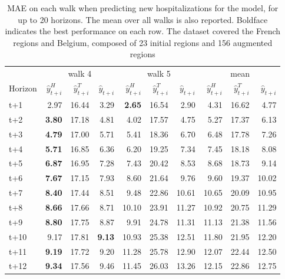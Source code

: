 \begin{table}[H]
\centering
\caption{MAE on each walk when predicting new hospitalizations for the model, for up to 20 horizons. The mean over all walks is also reported. Boldface indicates the best performance on each row. The dataset covered the French regions and Belgium, composed of 23 initial regions and 156 augmented regions }
\label{tab:MAE_walk_assemble}
\begin{tabular}{lrrrrrrrrr}
\toprule
 & \multicolumn{3}{c}{walk 4} & \multicolumn{3}{c}{walk 5} & \multicolumn{3}{c}{mean} 
\\

\cmidrule(lr){2-4} \cmidrule(lr){5-7} \cmidrule(lr){8-10} 
Horizon & $\hat{y}_{t+i}^H$ & $\hat{y}_{t+i}^T$ & $\hat{y}_{t+i}$ & $\hat{y}_{t+i}^H$ & $\hat{y}_{t+i}^T$ & $\hat{y}_{t+i}$ & $\hat{y}_{t+i}^H$ & $\hat{y}_{t+i}^T$ & $\hat{y}_{t+i}$ \\
\midrule
t+1  & 2.97  & 16.44  & 3.29  & \textbf{2.65}  & 16.54  & 2.90  & 4.31  & 16.62  & 4.77  \\
t+2  & \textbf{3.80}  & 17.18  & 4.81  & 4.02  & 17.57  & 4.75  & 5.27  & 17.37  & 6.13  \\
t+3  & \textbf{4.79}  & 17.00  & 5.71  & 5.41  & 18.36  & 6.70  & 6.48  & 17.78  & 7.26  \\
t+4  & \textbf{5.71}  & 16.85  & 6.36  & 6.20  & 19.25  & 7.34  & 7.45  & 18.18  & 8.08  \\
t+5  & \textbf{6.87}  & 16.95  & 7.28  & 7.43  & 20.42  & 8.53  & 8.68  & 18.73  & 9.14  \\
t+6  & \textbf{7.67}  & 17.15  & 7.93  & 8.60  & 21.64  & 9.76  & 9.60  & 19.37  & 10.02  \\
t+7  & \textbf{8.40}  & 17.44  & 8.51  & 9.48  & 22.86  & 10.61  & 10.65  & 20.09  & 10.95  \\
t+8  & \textbf{8.66}  & 17.66  & 8.71  & 10.10  & 23.91  & 11.27  & 10.92  & 20.75  & 11.29  \\
t+9  & \textbf{8.80}  & 17.75  & 8.87  & 9.91  & 24.78  & 11.31  & 11.13  & 21.38  & 11.56  \\
t+10  & 9.17  & 17.81  & \textbf{9.13}  & 10.93  & 25.38  & 12.51  & 11.80  & 21.95  & 12.20  \\
t+11  & \textbf{9.19}  & 17.72  & 9.20  & 11.28  & 25.78  & 12.90  & 12.07  & 22.44  & 12.50  \\
t+12  & \textbf{9.34}  & 17.56  & 9.46  & 11.45  & 26.03  & 13.26  & 12.15  & 22.86  & 12.75  \\

\end{tabular}
\end{table}
